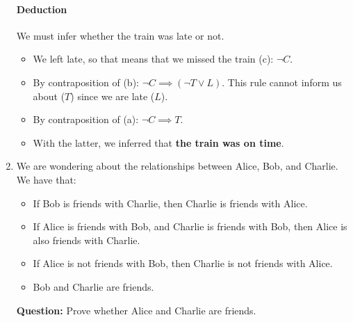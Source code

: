 \documentclass[11pt]{article}
\numberwithin{equation}{section}
\newcommand{\sol}[1]{
    }
\begin{document}
\begin{enumerate}
{        \paragraph{Deduction}
        We must infer whether the train was late or not.
        \begin{itemize}
            \item We left late, so that means that we missed the train (c): $\neg C$.
            \item By contraposition of (b): $\neg C \implies (\neg T \lor L)$. This rule cannot inform us about ($T$) since we are late ($L$).
            \item By contraposition of (a): $\neg C \implies T$.
            \item With the latter, we inferred that \textbf{the train was on time}.
        \end{itemize}
    }

    \iffalse
    \item We are wondering about the relationships between Alice, Bob, and Charlie. We have that:
    
    \begin{itemize}
        \item If Bob is friends with Charlie, then Charlie is friends with Alice.
        \item If Alice is friends with Bob, and Charlie is friends with Bob, then Alice is also friends with Charlie.
        \item If Alice is not friends with Bob, then Charlie is not friends with Alice.
        \item Bob and Charlie are friends.
    \end{itemize}
    \textbf{Question:} Prove whether Alice and Charlie are friends.
    
    \sol{
        \paragraph{Notations}
        \begin{itemize}
            \item Alice is friends with Bob: $A_B$.
            \item Alice is friends with Charlie: $A_C$.
            \item Bob is friends with Alice: $B_A$.
            \item Bob is friends with Charlie: $B_C$.
            \item Charlie is friends with Alice: $C_A$.
            \item Charlie is friends with Bob: $C_B$.
        \end{itemize}

}
\end{enumerate}
\end{document}
